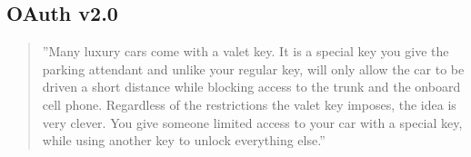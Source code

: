 \documentclass[finnish,gradu]{tktltiki}
\begin{document}








  \subsection{OAuth v2.0} %
  \label{sub:oauth}

  \begin{quote}
    ''Many luxury cars come with a valet key. It is a special key you give the parking attendant and unlike your regular key, will only allow the car to be driven a short distance while blocking access to the trunk and the onboard cell phone. Regardless of the restrictions the valet key imposes, the idea is very clever. You give someone limited access to your car with a special key, while using another key to unlock everything else.''~\cite{hueniverse_oauth_intro}
  \end{quote}
\end{document}
